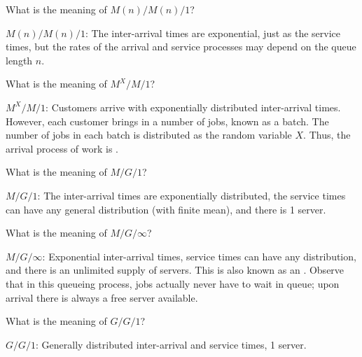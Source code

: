 \begin{exercise}[\faPhoto]
  What is the meaning of $M(n)/M(n)/1$?
  \begin{solution}
$M(n)/M(n)/1$: The inter-arrival times are exponential, just as
  the service times, but the rates of the arrival and service processes
  may depend on the queue length $n$. 
  \end{solution}
\end{exercise}


\begin{exercise}[\faPhoto]
  What is the meaning of $M^X/M/1$?
  \begin{solution}
 $M^X/M/1$: Customers arrive with exponentially distributed
  inter-arrival times. However, each customer brings in a number of
  jobs, known as a batch. The number of jobs in each batch is
  distributed as the random variable $X$. Thus, the arrival process of
  work is .
  \end{solution}
\end{exercise}

\begin{exercise}[\faPhoto]
  What is the meaning of $M/G/1$?
  \begin{solution}
$M/G/1$: The inter-arrival times are exponentially distributed,
  the service times can have any general distribution (with
  finite mean), and there is 1 server.
  \end{solution}
\end{exercise}


\begin{exercise}[\faPhoto]
  What is the meaning of $M/G/\infty$?
  \begin{solution}
 $M/G/\infty$: Exponential inter-arrival times, service times can
  have any distribution, and there is an unlimited supply of
  servers. This is also known as an . Observe
  that in this queueing process, jobs actually never have to wait in
  queue; upon arrival there is always a free server available.
  \end{solution}
\end{exercise}

\begin{exercise}[\faPhoto]
  What is the meaning of $G/G/1$?
  \begin{solution}
 $G/G/1$: Generally distributed inter-arrival and service times, 1 server.
  \end{solution}
\end{exercise}

